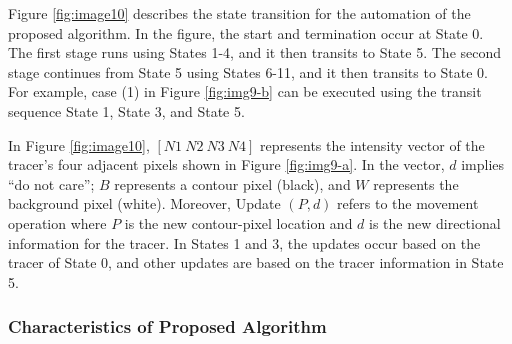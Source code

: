 
Figure \ref{fig:image10} describes the state transition for the automation of the proposed algorithm. In the figure, the start and termination occur at State 0. The first stage runs using States 1-4, and it then transits to State 5. The second stage continues from State 5 using States 6-11, and it then transits to State 0. For example, case (1) in Figure \ref{fig:img9-b} can be executed using the transit sequence State 1, State 3, and State 5.


In Figure \ref{fig:image10}, $[N1\ N2\ N3\ N4]$ represents the intensity vector of the tracer's four adjacent pixels shown in Figure \ref{fig:img9-a}. In the vector, $d$ implies ``do not care''; $B$ represents a contour pixel (black), and $W$ represents the background pixel (white). Moreover, Update $(P,d)$ refers to the movement operation where $P$ is the new contour-pixel location and $d$ is the new directional information for the tracer. In States 1 and 3, the updates occur based on the tracer of State 0, and other updates are based on the tracer information in State 5.

\subsubsection{Characteristics of Proposed Algorithm}

